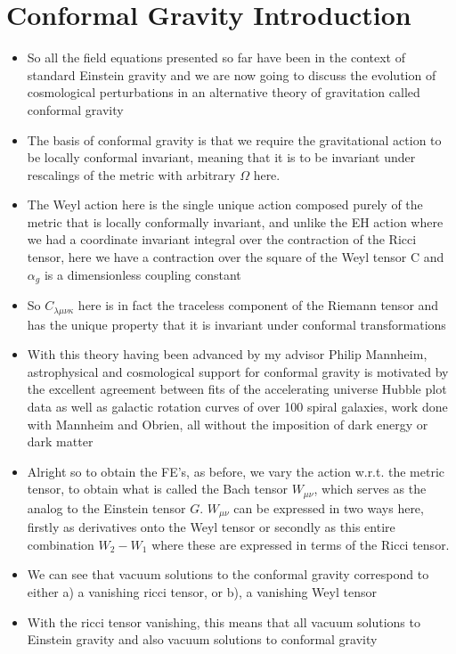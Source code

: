 \documentclass[10pt,letterpaper]{article}
\numberwithin{equation}{section}
\begin{document}
\section{Conformal Gravity Introduction}
\begin{itemize}
	\item So all the field equations presented so far have been in the context of standard Einstein gravity and we are now going to discuss the evolution of cosmological perturbations in an alternative theory of gravitation called conformal gravity
	\item The basis of conformal gravity is that we require the gravitational action to be locally conformal invariant, meaning that it is to be invariant under rescalings of the metric with arbitrary $\Omega$ here.
	\item The Weyl action here is the single unique action composed purely of the metric that is locally conformally invariant, and unlike the EH action where we had a coordinate invariant integral over the contraction of the Ricci tensor, here we have a contraction over the square of the Weyl tensor C and $\alpha_g$ is a dimensionless coupling constant
	\item So $C_{\lambda\mu\nu\kappa}$ here is in fact the traceless component of the Riemann tensor and has the unique property that it is invariant under conformal transformations
	\item With this theory having been advanced by my advisor Philip Mannheim, astrophysical and cosmological support for conformal gravity is motivated by the excellent agreement between fits of the accelerating universe Hubble plot data as well as galactic rotation curves of over 100 spiral galaxies, work done with Mannheim and Obrien, all without the imposition of dark energy or dark matter
	\item Alright so to obtain the FE's, as before, we vary the action w.r.t. the metric tensor, to obtain what is called the Bach tensor $W_{\mu\nu}$, which serves as the analog to the Einstein tensor $G$. $W_{\mu\nu}$ can be expressed in two ways here, firstly  as derivatives onto the Weyl tensor or secondly as this entire combination $W_2 - W_1$ where these are expressed in terms of the Ricci tensor.
	\item We can see that vacuum solutions to the conformal gravity correspond to either a) a vanishing ricci tensor, or b), a vanishing Weyl tensor
	\item With the ricci tensor vanishing, this means that all vacuum solutions to Einstein gravity and also vacuum solutions to conformal gravity

\end{itemize}
\end{document}
